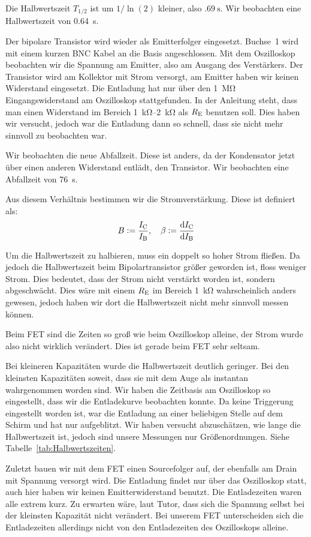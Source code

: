 Die Halbwertszeit $T_{1/2}$ ist um $1/\ln(2)$ kleiner, also $\SI{.69}\second$.
Wir beobachten eine Halbwertszeit von \SI{0.64}{\second}.

Der bipolare Transistor wird wieder als Emitterfolger eingesetzt. Buchse~1 wird
mit einem kurzen BNC Kabel an die Basis angeschlossen. Mit dem Oszilloskop
beobachten wir die Spannung am Emitter, also am Ausgang des Verstärkers. Der
Transistor wird am Kollektor mit Strom versorgt, am Emitter haben wir keinen
Widerstand eingesetzt. Die Entladung hat nur über den \SI{1}{\mega\ohm}
Eingangswiderstand am Oszilloskop stattgefunden. In der Anleitung steht, dass
man einen Widerstand im Bereich \SIrange{1}{2}{\kilo\ohm} als $R_\text{E}$ benutzen
soll. Dies haben wir versucht, jedoch war die Entladung dann so schnell, dass
sie nicht mehr sinnvoll zu beobachten war.

Wir beobachten die neue Abfallzeit. Diese ist anders, da der Kondensator jetzt
über einen anderen Widerstand entlädt, den Transistor. Wir beobachten eine
Abfallzeit von \SI{76}{\second}.

Aus diesem Verhältnis bestimmen wir die Stromverstärkung. Diese ist definiert
als:
\[
	B := \frac\IC\IB
	\eqnsep
	\beta := \frac{\dif\IC}{\dif\IB}
\]

Um die Halbwertszeit zu halbieren, muss ein doppelt so hoher Strom fließen. Da
jedoch die Halbwertszeit beim Bipolartransistor größer geworden ist, floss
weniger Strom. Dies bedeutet, dass der Strom nicht verstärkt worden ist,
sondern abgeschwächt. Dies wäre mit einem $R_\text{E}$ im Bereich \SI{1}{\kilo\ohm}
wahrscheinlich anders gewesen, jedoch haben wir dort die Halbwertszeit nicht
mehr sinnvoll messen können.

Beim FET sind die Zeiten so groß wie beim Oszilloskop alleine, der Strom wurde
also nicht wirklich verändert. Dies ist gerade beim FET sehr seltsam.

Bei kleineren Kapazitäten wurde die Halbwertszeit deutlich geringer. Bei den
kleinsten Kapazitäten soweit, dass sie mit dem Auge als instantan wahrgenommen
worden sind. Wir haben die Zeitbasis am Oszilloskop so eingestellt, dass wir
die Entladekurve beobachten konnte. Da keine Triggerung eingestellt worden ist,
war die Entladung an einer beliebigen Stelle auf dem Schirm und hat nur
aufgeblitzt. Wir haben versucht abzuschätzen, wie lange die Halbwertszeit ist,
jedoch sind unsere Messungen nur Größenordnungen. Siehe
Tabelle~\ref{tab:Halbwertszeiten}.

Zuletzt bauen wir mit dem FET einen Sourcefolger auf, der ebenfalls am Drain
mit Spannung versorgt wird. Die Entladung findet nur über das Oszilloskop
statt, auch hier haben wir keinen Emitterwiderstand benutzt. Die Entladezeiten
waren alle extrem kurz. Zu erwarten wäre, laut Tutor, dass sich die Spannung
selbst bei der kleinsten Kapazität nicht verändert. Bei unserem FET
unterscheiden sich die Entladezeiten allerdings nicht von den Entladezeiten des
Oszilloskops alleine.

